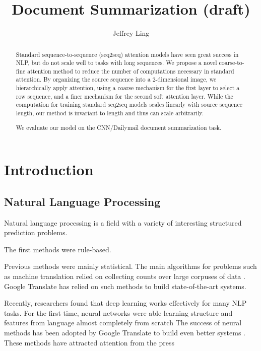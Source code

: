 \documentclass[11pt]{report}
\title{Document Summarization (draft)}
\author{Jeffrey Ling}
\begin{document}
\maketitle{}

\begin{abstract} %
Standard sequence-to-sequence (seq2seq) attention models have seen great success in NLP, but do not scale well to tasks with long sequences. We propose a novel coarse-to-fine attention method to reduce the number of computations necessary in standard attention. By organizing the source sequence into a 2-dimensional image, we hierarchically apply attention, using a coarse mechanism for the first layer to select a row sequence, and a finer mechanism for the second soft attention layer. While the computation for training standard seq2seq models scales linearly with source sequence length, our method is invariant to length and thus can scale arbitrarily.

We evaluate our model on the CNN/Dailymail document summarization task.
\end{abstract}

\tableofcontents{}




\chapter{Introduction}

\section{Natural Language Processing}

Natural language processing is a field with a variety of interesting structured prediction problems. 


The first methods were rule-based. %

Previous methods were mainly statistical. The main algorithms for problems such as machine translation  relied on collecting counts over large corpuses of data \citep{Brown1993}. Google Translate has relied on such methods to build state-of-the-art systems.

Recently, researchers found that deep learning works effectively for many NLP tasks. For the first time, neural networks were able learning structure and features from language almost completely from scratch \cite{Collobert2011} %
The success of neural methods has been adopted by Google Translate to build even better systems \cite{GoogleTranslate2016}. These methods have attracted attention from the press %
\end{document}
